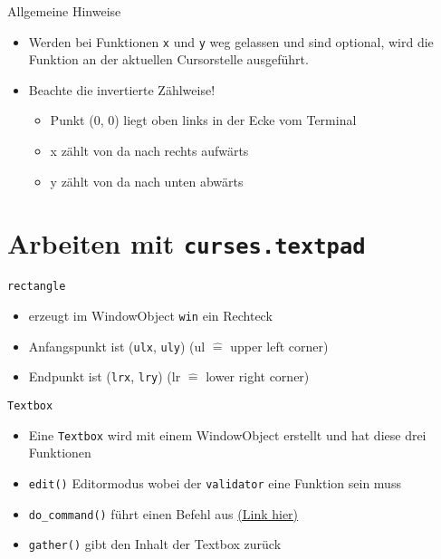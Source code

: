 \begin{frame}{Allgemeine Hinweise}
	\begin{itemize}
		\item Werden bei Funktionen \texttt{x} und \texttt{y} weg gelassen und sind optional, wird die Funktion an der aktuellen Cursorstelle ausgeführt.
		\item Beachte die invertierte Zählweise!
		\begin{itemize}
			\item Punkt (0, 0) liegt oben links in der Ecke vom Terminal
			\item x zählt von da nach rechts aufwärts
			\item y zählt von da nach unten abwärts
		\end{itemize}
	\end{itemize}
\end{frame}

\section{Arbeiten mit \texttt{curses.textpad}}
\begin{frame}{\texttt{rectangle}}
	
	\begin{itemize}
		\item erzeugt im WindowObject \texttt{win} ein Rechteck
		\item Anfangspunkt ist (\texttt{ulx}, \texttt{uly}) (ul $\hat=$ upper left corner)
		\item Endpunkt ist (\texttt{lrx}, \texttt{lry}) (lr $\hat=$ lower right corner)
	\end{itemize}
\end{frame}

\begin{frame}{\texttt{Textbox}}
	
	\begin{itemize}
		\item Eine \texttt{Textbox} wird mit einem WindowObject erstellt und hat diese drei Funktionen
		\item \texttt{edit()} \glqq{}Editormodus\grqq{} wobei der \texttt{validator} eine Funktion sein muss
		\item \texttt{do\_command()} f\"uhrt einen Befehl aus \href{http://bit.ly/29sJ8QJ}{(Link hier)}
		\item \texttt{gather()} gibt den Inhalt der Textbox zur\"uck
	\end{itemize}
\end{frame}



